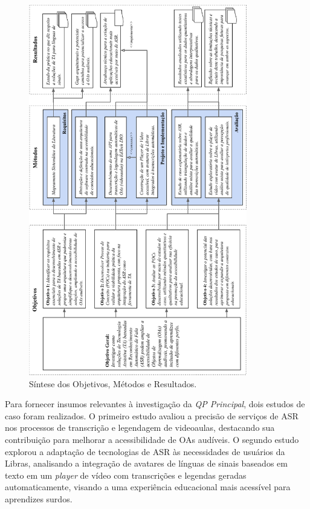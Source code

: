 \begin{figure}[htbp]
\caption{Síntese dos Objetivos, Métodos e Resultados.}
\label{chapter5-phd-synthesis}
\centerline{\includegraphics[width=0.85\textwidth]{images/chapter5-phd-synthesis.pdf}}
\fautor
\end{figure}

Para fornecer insumos relevantes à investigação da \textit{QP Principal}, dois estudos de caso foram realizados. O primeiro estudo avaliou a precisão de serviços de ASR nos processos de transcrição e legendagem de videoaulas, destacando sua contribuição para melhorar a acessibilidade de OAs audíveis. O segundo estudo explorou a adaptação de tecnologias de ASR às necessidades de usuários da Libras, analisando a integração de avatares de línguas de sinais baseados em texto em um \textit{player} de vídeo com transcrições e legendas geradas automaticamente, visando a uma experiência educacional mais acessível para aprendizes surdos.

